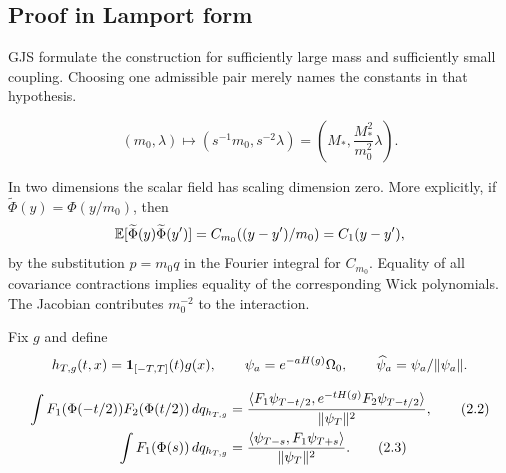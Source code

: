 \documentclass[11pt,a4paper]{article}
\begin{document}
\subsection*{Proof in Lamport form}



\Because GJS formulate the construction for sufficiently large mass and sufficiently
small coupling.  Choosing one admissible pair merely names the constants in that
hypothesis.

\[
 (m_0,\lambda)\longmapsto (s^{-1}m_0,s^{-2}\lambda)
       =\left(M_*,\frac{M_*^2}{m_0^2}\lambda\right).                 \tag{2.1}
\]


\Because In two dimensions the scalar field has scaling dimension zero.  More
explicitly, if $\widetilde\Phi(y)=\Phi(y/m_0)$, then
\[
 \mathbb E[\widetilde\Phi(y)\widetilde\Phi(y')]
 =C_{m_0}((y-y')/m_0)=C_1(y-y'),
\]
by the substitution $p=m_0q$ in the Fourier integral for $C_{m_0}$.  Equality of
all covariance contractions implies equality of the corresponding Wick polynomials.
The Jacobian contributes $m_0^{-2}$ to the interaction.


\QedStep


Fix $g$ and define
\[
 h_{T,g}(t,x)=\mathbf1_{[-T,T]}(t)g(x),\qquad
 \psi_a=e^{-aH(g)}\Omega_0,\qquad \widehat\psi_a=\psi_a/\|\psi_a\|.
\]

\begin{align}
 \int F_1(\Phi(-t/2))F_2(\Phi(t/2))\,dq_{h_{T,g}}
 &=\frac{\langle F_1\psi_{T-t/2},e^{-tH(g)}F_2\psi_{T-t/2}\rangle}
         {\|\psi_T\|^2},                                           \tag{2.2}\\
 \int F_1(\Phi(s))\,dq_{h_{T,g}}
 &=\frac{\langle \psi_{T-s},F_1\psi_{T+s}\rangle}{\|\psi_T\|^2}.          \tag{2.3}
\end{align}
\end{document}
